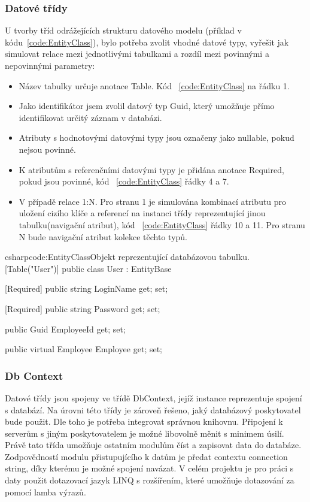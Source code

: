 \documentclass[
  biblatex,
  glossaries,
  index
]{kidiplom}
\begin{document}
\subsubsection{Datové třídy}
 U tvorby tříd odrážejících strukturu datového modelu (příklad v kódu~\ref{code:EntityClass}), bylo potřeba zvolit vhodné datové typy, vyřešit jak simulovat relace mezi jednotlivými tabulkami a rozdíl mezi povinnými a nepovinnými parametry:
\begin{itemize}
	\item Název tabulky určuje anotace Table. Kód ~\ref{code:EntityClass} na řádku 1. 
	\item Jako identifikátor jsem zvolil datový typ Guid, který umožňuje přímo identifikovat určitý záznam v databázi.
	\item Atributy s hodnotovými datovými typy jsou označeny jako nullable, pokud nejsou povinné.
	\item K atributům s referenčními datovými typy je přidána anotace Required, pokud jsou povinné, kód ~\ref{code:EntityClass} řádky 4 a 7.
	\item V případě relace 1:N. Pro stranu 1 je simulována kombinací atributu pro uložení cizího klíče a referencí na instanci třídy reprezentující jinou tabulku(navigační atribut), kód ~\ref{code:EntityClass} řádky 10 a 11. Pro stranu N bude navigační atribut kolekce těchto typů.
\end{itemize}

\begin{kicode}{csharp}{code:EntityClass}{Objekt reprezentující databázovou tabulku.}
[Table("User")]
    public class User : EntityBase
    {
        [Required]
        public string LoginName { get; set; }

        [Required]
        public string Password { get; set; }

        public Guid EmployeeId { get; set; }

        public virtual Employee Employee { get; set; }
    }
\end{kicode}

\subsubsection{Db Context}
Datové třídy jsou spojeny ve třídě DbContext, jejíž instance reprezentuje spojení s databází. Na úrovni této třídy je zároveň řešeno, jaký databázový poskytovatel bude použit. Dle toho je potřeba integrovat správnou knihovnu. Připojení k serverům s jiným poskytovatelem je možné libovolně měnit s minimem úsilí. Právě tato třída umožňuje ostatním modulům číst a zapisovat data do databáze. Zodpovědností modulu přistupujícího k datům je předat contextu connection string, díky kterému je možné spojení navázat. V celém projektu je pro práci s daty použit dotazovací jazyk LINQ s rozšířením, které umožňuje dotazování za pomocí lamba výrazů.
\end{document}
